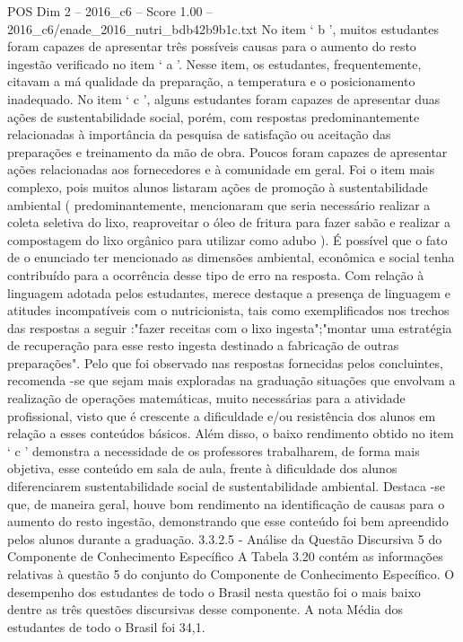 \begin{textsample}{POS Dim 2 – 2016\_c6 – Score 1.00 – 2016\_c6/enade\_2016\_nutri\_bdb42b9b1c.txt}
No item ‘ b ’, muitos estudantes foram capazes de apresentar três possíveis causas para o aumento do resto ingestão verificado no item ‘ a ’.
Nesse item, os estudantes, frequentemente, citavam a má qualidade da preparação, a temperatura e o posicionamento inadequado.
No item ‘ c ’, alguns estudantes foram capazes de apresentar duas ações de sustentabilidade social, porém, com respostas predominantemente relacionadas à importância da pesquisa de satisfação ou aceitação das preparações e treinamento da mão de obra.
Poucos foram capazes de apresentar ações relacionadas aos fornecedores e à comunidade em geral.
Foi o item mais complexo, pois muitos alunos listaram ações de promoção à sustentabilidade ambiental ( predominantemente, mencionaram que seria necessário realizar a coleta seletiva do lixo, reaproveitar o óleo de fritura para fazer sabão e realizar a compostagem do lixo orgânico para utilizar como adubo ).
É possível que o fato de o enunciado ter mencionado as dimensões ambiental, econômica e social tenha contribuído para a ocorrência desse tipo de erro na resposta.
Com relação à linguagem adotada pelos estudantes, merece destaque a presença de linguagem e atitudes incompatíveis com o nutricionista, tais como exemplificados nos trechos das respostas a seguir :"fazer receitas com o lixo ingesta";"montar uma estratégia de recuperação para esse resto ingesta destinado a fabricação de outras preparações".
Pelo que foi observado nas respostas fornecidas pelos concluintes, recomenda -se que sejam mais exploradas na graduação situações que envolvam a realização de operações matemáticas, muito necessárias para a atividade profissional, visto que é crescente a dificuldade e/ou resistência dos alunos em relação a esses conteúdos básicos.
Além disso, o baixo rendimento obtido no item ‘ c ’ demonstra a necessidade de os professores trabalharem, de forma mais objetiva, esse conteúdo em sala de aula, frente à dificuldade dos alunos diferenciarem sustentabilidade social de sustentabilidade ambiental.
Destaca -se que, de maneira geral, houve bom rendimento na identificação de causas para o aumento do resto ingestão, demonstrando que esse conteúdo foi bem apreendido pelos alunos durante a graduação. 3.3.2.5 - Análise da Questão Discursiva 5 do Componente de Conhecimento Específico A Tabela 3.20 contém as informações relativas à questão 5 do conjunto do Componente de Conhecimento Específico.
O desempenho dos estudantes de todo o Brasil nesta questão foi o mais baixo dentre as três questões discursivas desse componente.
A nota Média dos estudantes de todo o Brasil foi 34,1.

\end{textsample}

